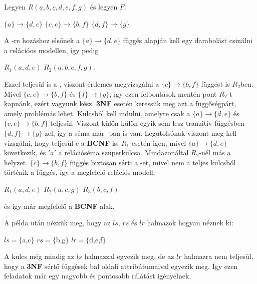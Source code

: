 \begin{pld}
Legyen $R(\underline{a},b,\underline{c},d,e,f,g)$ és legyen $F$:
\begin{center}
    $\{a\} \longrightarrow \{d,e\}$ \break
    $\{c,e\} \longrightarrow \{b,f\}$ \break
    $\{d,f\} \longrightarrow \{g\}$ \break
\end{center}
A \nfk-re hozáshoz elsőnek a $\{a\} \longrightarrow \{d,e\}$ függés alapján kell egy darabolást csinálni a relációos modellen, így pedig
\begin{center}
    $R_1(\underline{a},d,e)$ \break
    $R_2(\underline{a},b,\underline{c},f,g).$ \break
\end{center}
Ezzel teljesül is a \nfk, viszont érdemes megvizsgálni a  $\{c\} \longrightarrow \{b,f\}$ függést is $R_2$ben. Mivel  $\{c,e\} \longrightarrow \{b,f\}$ és $\{f\} \longrightarrow \{g\}$, így ezen felbontások mentén pont $R_2$-t kapnánk, ezért vagyunk kész.
\textbf{3NF} esetén keressük meg azt a függőségpárt, amely problémás lehet. Kulcsból kell indulni, amelyre csak a $\{a\} \longrightarrow \{d,e\}$ és $\{c,e\} \longrightarrow \{b,f\}$  teljesül. Viszont külön külön egyik sem lesz tranzitív függésben $\{d,f\} \longrightarrow \{g\}$-zel, így a séma már \nfh-ban is van.
Legutolsónak viszont meg kell vizsgálni, hogy teljesül-e a \textbf{BCNF} is. $R_1$ esetén igen, mivel $\{a\} \longrightarrow \{d,e\}$ következik, és $'a'$ a relációséma szuperkulcsa. Mindazonáltal $R_2$-nél más a helyzet. 
$\{c\} \longrightarrow \{b,f\}$ függés biztosan sérti a \BCNF-et, mivel nem a teljes kulcsból történik a függés, így a megfelelő relációs modell:
\begin{center}
    $R_1(\underline{a},d,e)$ \break
    $R_2(\underline{a},\underline{c},g)$ \break
    $R_3(b,\underline{c},f)$
\end{center}
és így már megfelelő a \textbf{BCNF} alak.
\end{pld}

A példa után nézzük meg, hogy az $ls$, $rs$ és $lr$ halmazok hogyan néznek ki:
\begin{center}
    $ls = \{$a,c$\}$ \break
    $rs = \{$b,g$\}$ \break
    $lr = \{$d,e,f$\}$
\end{center}

A kulcs még mindig az $ls$ halmazzal egyezik meg, de az $lr$ halmazra nem teljesül, hogy a \textbf{3NF} sértő függések bal oldali attribútumaival egyezik meg. Így ezen feladatok már egy nagyobb és pontosabb rálátást igényelnek.

